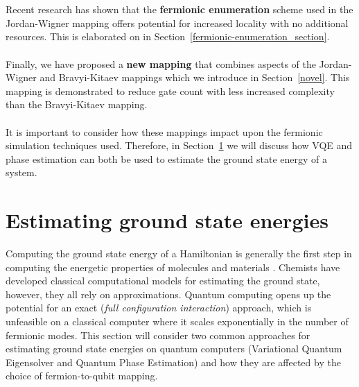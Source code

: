 \documentclass[twoside]{article}
\begin{document}
\\\\
Recent research \cite{fermionicEncoding} has shown that the \textbf{fermionic enumeration} scheme used in the Jordan-Wigner mapping offers potential for increased locality with no additional resources. This is elaborated on in Section~\ref{fermionic-enumeration_section}.
\\\\
Finally, we have proposed a \textbf{new mapping} that combines aspects of the Jordan-Wigner and Bravyi-Kitaev mappings which we introduce in Section~\ref{novel}. This mapping is demonstrated to reduce gate count with less increased complexity than the Bravyi-Kitaev mapping.\\\\
It is important to consider how these mappings impact upon the fermionic simulation techniques used. Therefore, in Section~\ref{applications_section} we will discuss how VQE and phase estimation can both be used to estimate the ground state energy of a system.
\section{Estimating ground state energies}\label{applications_section}
Computing the ground state energy of a Hamiltonian is generally the first step in computing the energetic properties of molecules and materials \cite{vqe}. Chemists have developed classical computational models for estimating the ground state, however, they all rely on approximations. Quantum computing opens up the potential for an exact (\textit{full configuration interaction}) approach, which is unfeasible on a classical computer where it scales exponentially in the number of fermionic modes. This section will consider two common approaches for estimating ground state energies on quantum computers (Variational Quantum Eigensolver and Quantum Phase Estimation) and how they are affected by the choice of fermion-to-qubit mapping.
\end{document}
